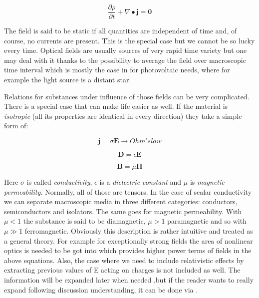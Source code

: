 \begin{equation}
\frac{\partial\rho}{\partial t} + \nabla \bullet \mathbf{j = 0}
\end{equation}

The field is said to be static if all quantities are independent of time
and, of course, no currents are present. This is the special case but we
cannot be so lucky every time. Optical fields are usually sources of
very rapid time variety but one may deal with it thanks to the
possibility to average the field over macroscopic time interval which is
mostly the case in for photovoltaic needs, where for example the light
source is a distant star.

Relations for substances under influence of those fields can be very
complicated. There is a special case that can make life easier as well.
If the material is \emph{isotropic} (all its properties are identical in
every direction) they take a simple form of:

\begin{equation}
\mathbf{j} = \sigma\mathbf{E \rightarrow} Ohm's law
\end{equation}

\begin{equation}
\mathbf{D =}\epsilon\mathbf{E}
\end{equation}

\begin{equation}
\mathbf{B =}\mu\mathbf{H}
\end{equation}


Here \(\sigma\) is called \emph{conductivity}, \(\epsilon\) is a
\emph{dielectric constant} and \(\mu\) is \emph{magnetic permeability.}
Normally, all of those are tensors. In the case of scalar conductivity
we can separate macroscopic media in three different categories:
conductors, semiconductors and isolators. The same goes for magnetic
permeability. With \(\mu < 1\) the substance is said to be diamagnetic,
\(\mu > 1\) paramagnetic and so with \(\mu \gg 1\) ferromagnetic.
Obviously this description is rather intuitive and treated as a general
theory. For example for exceptionally strong fields the area of
nonlinear optics is needed to be got into which provides higher power
terms of fields in the above equations. Also, the case where we need to
include relativistic effects by extracting previous values of E acting
on charges is not included as well. The information will be expanded
later when needed ,but if the reader wants to really expand following
discussion understanding, it can be done via \cite{Born1999} \cite{Jackson}.


